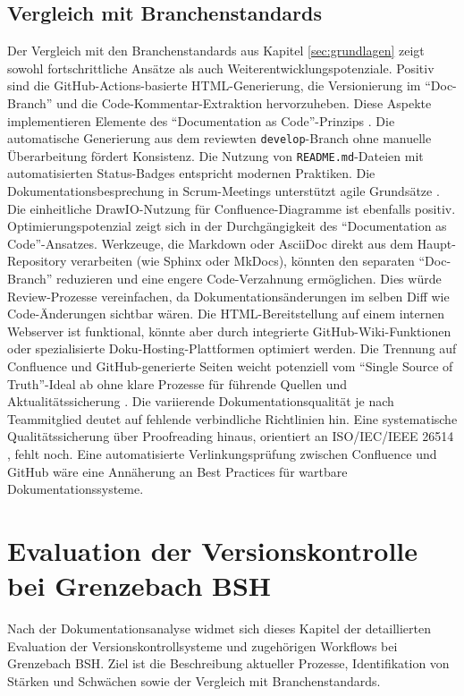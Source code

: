 \documentclass[12pt,oneside]{article}
\begin{document}
    \subsection{Vergleich mit Branchenstandards}
    \label{subsec:vergleich_dok}
    Der Vergleich mit den Branchenstandards aus Kapitel \ref{sec:grundlagen} zeigt sowohl fortschrittliche Ansätze als auch Weiterentwicklungspotenziale.
    \newline
    Positiv sind die GitHub-Actions-basierte HTML-Generierung, die Versionierung im ``Doc-Branch'' und die Code-Kommentar-Extraktion hervorzuheben. Diese Aspekte implementieren Elemente des ``Documentation as Code''-Prinzips \cite{WriteTheDocsWhatIsDocsAsCode}. Die automatische Generierung aus dem reviewten \texttt{develop}-Branch ohne manuelle Überarbeitung fördert Konsistenz. Die Nutzung von \texttt{README.md}-Dateien mit automatisierten Status-Badges entspricht modernen Praktiken. Die Dokumentationsbesprechung in Scrum-Meetings unterstützt agile Grundsätze \cite{AgileManifestoDe, fraunhoferIESE2020agilMytho}. Die einheitliche DrawIO-Nutzung für Confluence-Diagramme ist ebenfalls positiv.
    \newline
    Optimierungspotenzial zeigt sich in der Durchgängigkeit des ``Documentation as Code''-Ansatzes. Werkzeuge, die Markdown oder AsciiDoc direkt aus dem Haupt-Repository verarbeiten (wie Sphinx oder MkDocs), könnten den separaten ``Doc-Branch'' reduzieren und eine engere Code-Verzahnung ermöglichen. Dies würde Review-Prozesse vereinfachen, da Dokumentationsänderungen im selben Diff wie Code-Änderungen sichtbar wären. Die HTML-Bereitstellung auf einem internen Webserver ist funktional, könnte aber durch integrierte GitHub-Wiki-Funktionen oder spezialisierte Doku-Hosting-Plattformen optimiert werden.
    \newline
    Die Trennung auf Confluence und GitHub-generierte Seiten weicht potenziell vom ``Single Source of Truth''-Ideal ab ohne klare Prozesse für führende Quellen und Aktualitätssicherung \cite{webmakers2024}. Die variierende Dokumentationsqualität je nach Teammitglied deutet auf fehlende verbindliche Richtlinien hin. Eine systematische Qualitätssicherung über Proofreading hinaus, orientiert an ISO/IEC/IEEE 26514 \cite{styrz2022normen}, fehlt noch. Eine automatisierte Verlinkungsprüfung zwischen Confluence und GitHub wäre eine Annäherung an Best Practices für wartbare Dokumentationssysteme.



    \section{Evaluation der Versionskontrolle bei Grenzebach BSH}
    \label{sec:evaluation_versionskontrolle}
    Nach der Dokumentationsanalyse widmet sich dieses Kapitel der detaillierten Evaluation der Versionskontrollsysteme und zugehörigen Workflows bei Grenzebach BSH. Ziel ist die Beschreibung aktueller Prozesse, Identifikation von Stärken und Schwächen sowie der Vergleich mit Branchenstandards.
\end{document}
